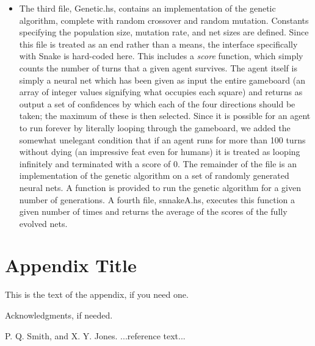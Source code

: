 \documentclass{sigplanconf}
\begin{document}
\begin{itemize}
 \item The third file, Genetic.hs, contains an implementation of the genetic algorithm, complete with random crossover and random mutation. Constants specifying the population size, mutation rate, and net sizes are defined. Since this file is treated as an end rather than a means, the interface specifically with Snake is hard-coded here. This includes a \textit{score} function, which simply counts the number of turns that a given agent survives. The agent itself is simply a neural net which has been given as input the entire gameboard (an array of integer values signifying what occupies each square) and returns as output a set of confidences by which each of the four directions should be taken; the maximum of these is then selected. Since it is possible for an agent to run forever by literally looping through the gameboard, we added the somewhat unelegant condition that if an agent runs for more than 100 turns without dying (an impressive feat even for humans) it is treated as looping infinitely and terminated with a score of 0. The remainder of the file is an implementation of the genetic algorithm on a set of randomly generated neural nets. A function is provided to run the genetic algorithm for a given number of generations. A fourth file, snnakeA.hs, executes this function a given number of times and returns the average of the scores of the fully evolved nets.
\end{itemize}

\appendix
\section{Appendix Title}

This is the text of the appendix, if you need one.

\acks

Acknowledgments, if needed.





\begin{thebibliography}{}
\softraggedright

P. Q. Smith, and X. Y. Jones. ...reference text...

\end{thebibliography}
\end{document}
